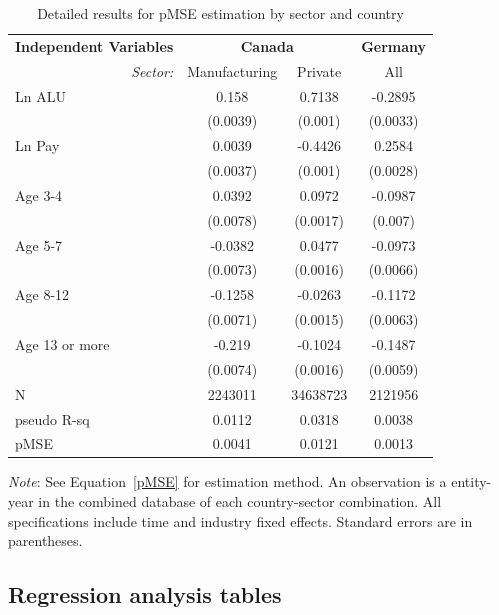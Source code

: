 \begin{table}[!htbp] \centering 
\setlength{\tabcolsep}{11pt}
\begin{threeparttable}
  \caption{Detailed results for pMSE estimation by sector and country} 
  \label{tab:pmse:details} 
\begin{tabular}{@{\extracolsep{5pt}} l|cc|c} 
\toprule
\textbf{Independent Variables} & \multicolumn{2}{c|}{\textbf{Canada}} & \textbf{Germany}\\
\multicolumn{1}{r|}{\it Sector:}&Manufacturing & Private & All \\ 
\midrule
Ln ALU & 0.158 & 0.7138 & -0.2895 \\ 
 & (0.0039) & (0.001) & (0.0033)\\
Ln Pay & 0.0039 & -0.4426 & 0.2584 \\ 
 & (0.0037) & (0.001) & (0.0028)\\
Age 3-4 & 0.0392 & 0.0972 & -0.0987 \\ 
 & (0.0078) & (0.0017) & (0.007)\\ 
Age 5-7 & -0.0382 & 0.0477 & -0.0973 \\ 
 & (0.0073) & (0.0016) & (0.0066)\\ 
Age 8-12 & -0.1258 & -0.0263 & -0.1172 \\ 
 & (0.0071) & (0.0015) & (0.0063)\\ 
Age 13 or more & -0.219 & -0.1024 & -0.1487 \\ 
 & (0.0074) & (0.0016) & (0.0059)\\ 
 \midrule
N & 2243011 & 34638723 & 2121956 \\ 
pseudo R-sq & 0.0112 & 0.0318 & 0.0038 \\ 
\midrule
pMSE & 0.0041 & 0.0121 & 0.0013 \\ 
\bottomrule
\end{tabular} 
\begin{tablenotes}
\small
\item \textit{Note}: See Equation~\ref{pMSE} for estimation method. An observation is a entity-year in the combined database of each country-sector combination. All specifications include  time and industry fixed effects. Standard errors are in parentheses. 
\end{tablenotes}
\end{threeparttable}
\end{table} 

\clearpage
\FloatBarrier
\clearpage
 
\subsection{Regression analysis tables}
\label{sec:regression_tables}

